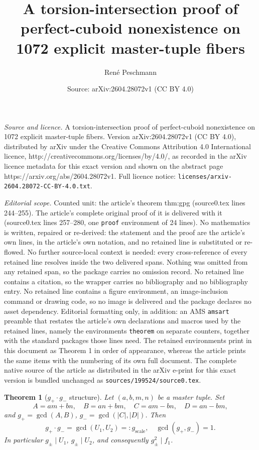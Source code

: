 \documentclass[10pt,a4paper]{amsart}
\title{A torsion-intersection proof of perfect-cuboid nonexistence on 1072 explicit master-tuple fibers}
\author{Ren\'e Peschmann}
\date{Source: arXiv:2604.28072v1 (CC BY 4.0)}
\newtheorem{theorem}{Theorem}
\begin{document}
\maketitle

\noindent\emph{Source and licence.} A torsion-intersection proof of perfect-cuboid nonexistence on 1072 explicit master-tuple fibers. Version arXiv:2604.28072v1 (CC BY 4.0), distributed by arXiv under the Creative Commons Attribution 4.0 International licence, http://creativecommons.org/licenses/by/4.0/, as recorded in the arXiv licence metadata for this exact version and shown on the abstract page https://arxiv.org/abs/2604.28072v1. Full licence notice: \texttt{licenses/arxiv-2604.28072-CC-BY-4.0.txt}.\par\smallskip

\noindent\textit{Editorial scope.} Counted unit: the article's theorem thm:gpg (source0.tex lines 244--255). The article's complete original proof of it is delivered with it (source0.tex lines 257--280, one \texttt{proof} environment of 24 lines). No mathematics is written, repaired or re-derived: the statement and the proof are the article's own lines, in the article's own notation, and no retained line is substituted or re-flowed.  No further source-local context is needed: every cross-reference of every retained line resolves inside the two delivered spans.  Nothing was omitted from any retained span, so the package carries no omission record.  No retained line contains a citation, so the wrapper carries no bibliography and no bibliography entry.  No retained line contains a figure environment, an image-inclusion command or drawing code, so no image is delivered and the package declares no asset dependency.  Editorial formatting only, in addition: an AMS \texttt{amsart} preamble that restates the article's own declarations and macros used by the retained lines, namely the environments \texttt{theorem} on separate counters, together with the standard packages those lines need.  The retained environments print in this document as Theorem 1 in order of appearance, whereas the article prints the same items with the numbering of its own full document.  The complete native source of the article as distributed in the arXiv e-print for this exact version is bundled unchanged as \texttt{sources/199524/source0.tex}.
\begin{theorem}[$g_+ \cdot g_-$ structure]
\label{thm:gpg}
Let $(a, b, m, n)$ be a master tuple. Set
$$
A = am + bn, \quad B = an + bm, \quad C = am - bn, \quad D = an - bm,
$$
and $g_+ = \gcd(A, B)$, $g_- = \gcd(|C|, |D|)$. Then
$$
g_+ \cdot g_- = \gcd(U_1, U_2) =: g_{\mathrm{scale}}, \quad \gcd(g_+, g_-) = 1.
$$
In particular $g_\pm \mid U_1$, $g_\pm \mid U_2$, and consequently $g_\pm^2 \mid f_1$.
\end{theorem}
\end{document}
